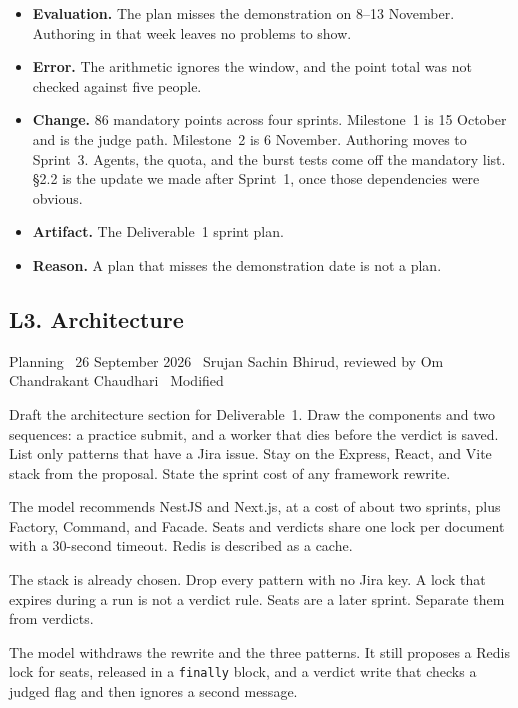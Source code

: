 \documentclass[11pt,a4paper]{article}
\newcommand{\meta}[1]{{\footnotesize\color{quiet}#1}\par\vspace{0.2em}}
\newcommand{\step}[1]{\par\vspace{0.45em}{\bfseries #1}\par\vspace{0.05em}}
\begin{document}
\step{3. Decision}
\begin{itemize}
\item \textbf{Evaluation.} The plan misses the demonstration on 8--13 November. Authoring in that week leaves no problems to show.
\item \textbf{Error.} The arithmetic ignores the window, and the point total was not checked against five people.
\item \textbf{Change.} 86 mandatory points across four sprints. Milestone~1 is 15 October and is the judge path. Milestone~2 is 6 November. Authoring moves to Sprint~3. Agents, the quota, and the burst tests come off the mandatory list. \S2.2 is the update we made after Sprint~1, once those dependencies were obvious.
\item \textbf{Artifact.} The Deliverable~1 sprint plan.
\item \textbf{Reason.} A plan that misses the demonstration date is not a plan.
\end{itemize}

\subsection{L3. Architecture}
\meta{Planning \textperiodcentered\ 26 September 2026 \textperiodcentered\ Srujan Sachin Bhirud, reviewed by Om Chandrakant Chaudhari \textperiodcentered\ Modified}

\step{1. Prompt}
Draft the architecture section for Deliverable~1. Draw the components and two sequences: a practice submit, and a worker that dies before the verdict is saved. List only patterns that have a Jira issue. Stay on the Express, React, and Vite stack from the proposal. State the sprint cost of any framework rewrite.

\step{2. Reply (summarised)}
The model recommends NestJS and Next.js, at a cost of about two sprints, plus Factory, Command, and Facade. Seats and verdicts share one lock per document with a 30-second timeout. Redis is described as a cache.

\step{3. Follow-up}
The stack is already chosen. Drop every pattern with no Jira key. A lock that expires during a run is not a verdict rule. Seats are a later sprint. Separate them from verdicts.

\step{4. Follow-up reply (summarised)}
The model withdraws the rewrite and the three patterns. It still proposes a Redis lock for seats, released in a \texttt{finally} block, and a verdict write that checks a judged flag and then ignores a second message.
\end{document}
